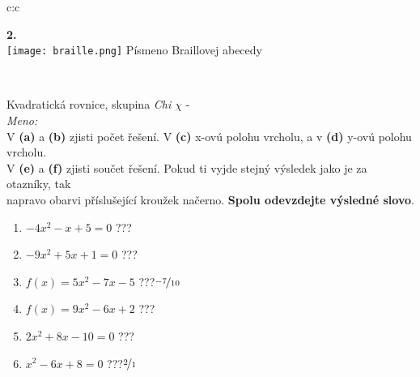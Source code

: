 \documentclass[10pt]{report}
\begin{document}
\begin{tabular}{c:c}
\begin{minipage}[c][99mm][t]{0.49\linewidth}
\begin{center}
\begin{minipage}{0.20\linewidth}
\begin{center}
{\Huge\bfseries 2.} \\[2mm]
\texttt{[image: braille.png]}
{\small Písmeno Braillovej abecedy}
\end{center}
\end{minipage}
\end{center}
\end{minipage}
\\ \hdashline
\begin{minipage}[c][99mm][t]{0.49\linewidth}
\begin{center}
\vspace{7mm}
{\huge Kvadratická rovnice, skupina \textit{Chi $\chi$} -}\\[4.5mm]
\textit{Meno:}\phantom{xxxxxxxxxxxxxxxxxxxxxxxxxxxxxxxxxxxxxxxxxxxxxxxxxxxxxxxxxxxxxxxxx}\\[3.5mm]
V \textbf{(a)} a \textbf{(b)} zjisti počet řešení. V \textbf{(c)} x-ovú polohu vrcholu, a v \textbf{(d)} y-ovú polohu vrcholu.\\V \textbf{(e)} a \textbf{(f)} zjisti součet řešení. Pokud ti vyjde stejný výsledek jako je za otazníky, tak\\napravo obarvi příslušející kroužek načerno. \textbf{Spolu odevzdejte výsledné slovo}.\\[3mm]
\begin{minipage}{0.77\linewidth}
\begin{center}
\begin{varwidth}{\textwidth}
\begin{enumerate}
\large
\item $-4x^2-x+5=0$\quad \dotfill\; ???\;\dotfill {}
\item $-9x^2+5x+1=0$\quad \dotfill\; ???\;\dotfill {}
\item $f(x)=5x^2-7x-5$\quad \dotfill\; ???\;\dotfill \quad $\nicefrac{-7}{10}$
\item $f(x)=9x^2-6x+2$\quad \dotfill\; ???\;\dotfill {}
\item $2x^2+8x-10=0$\quad \dotfill\; ???\;\dotfill {}
\item $x^2-6x+8=0$\quad \dotfill\; ???\;\dotfill \quad $\nicefrac{2}{1}$
\end{enumerate}
\end{varwidth}
\end{center}
\end{minipage}
\begin{minipage}{0.20\linewidth}
\begin{center}

\end{center}
\end{minipage}
\end{center}
\end{minipage}
\end{tabular}
\end{document}
